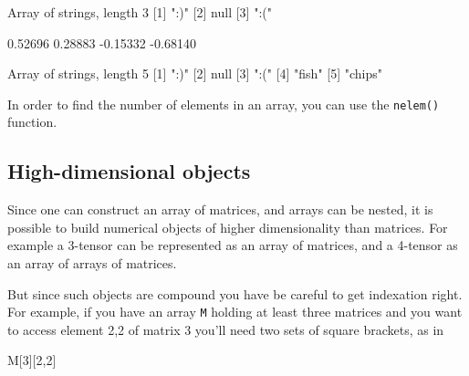 \begin{code}
Array of strings, length 3
[1] ":)"
[2] null
[3] ":("

     0.52696      0.28883 
    -0.15332     -0.68140 

Array of strings, length 5
[1] ":)"
[2] null
[3] ":("
[4] "fish"
[5] "chips"
\end{code}

In order to find the number of elements in an array, you can use the
\texttt{nelem()} function.

\subsection{High-dimensional objects}

Since one can construct an array of matrices, and arrays can be
nested, it is possible to build numerical objects of higher
dimensionality than matrices. For example a 3-tensor can be
represented as an array of matrices, and a 4-tensor as an array of
arrays of matrices.

But since such objects are compound you have be careful to get
indexation right. For example, if you have an array \texttt{M} holding
at least three matrices and you want to access element 2,2 of matrix 3
you'll need two sets of square brackets, as in
%
\begin{code}
M[3][2,2]
\end{code}


